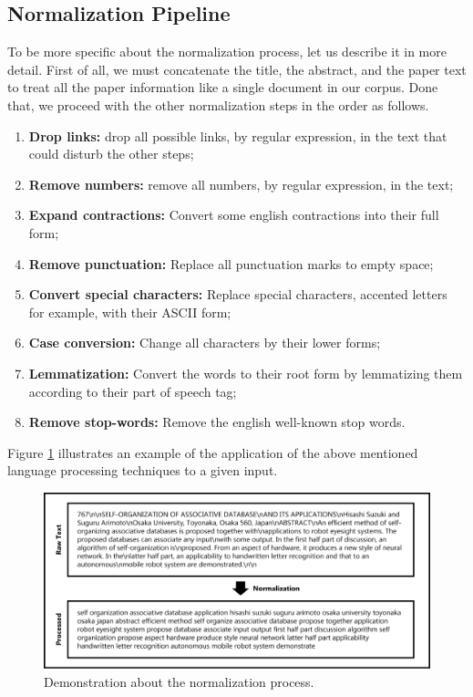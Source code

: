 \subsection{Normalization Pipeline}

To be more specific about the normalization process, let us describe it in more detail. First of all, we must concatenate the title, the abstract, and the paper text to treat all the paper information like a single document in our corpus. Done that, we proceed with the other normalization steps in the order as follows.

\begin{enumerate}
	\item \textbf{Drop links:} drop all possible links, by regular expression, in the text that could disturb the other steps;
	\item \textbf{Remove numbers:} remove all numbers, by regular expression, in the text;
	\item \textbf{Expand contractions:} Convert some english contractions into their full form;
	\item \textbf{Remove punctuation:} Replace all punctuation marks to empty space;
	\item \textbf{Convert special characters:} Replace special characters, accented letters for example, with their ASCII form;
	\item \textbf{Case conversion:} Change all characters by their lower forms;
	\item \textbf{Lemmatization:} Convert the words to their root form by lemmatizing them according to their part of speech tag;
	\item \textbf{Remove stop-words:} Remove the english well-known stop words.
\end{enumerate}

Figure \ref{fig:normalized-text} illustrates an example of the application of the above mentioned language processing techniques to a given input.

\begin{figure}[h!]
	\centering
	\includegraphics[width=\linewidth]{01.Chapters/04.Materials/normalization-process}
	\caption{Demonstration about the normalization process.}
	\label{fig:normalized-text}
\end{figure}

